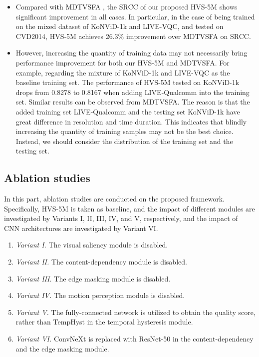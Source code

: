 \documentclass[journal]{IEEEtran}
\begin{document}
\begin{itemize}
\item Compared with MDTVSFA \cite{MDTVSFA}, the SRCC of our proposed HVS-5M shows significant improvement in all cases. In particular, in the case of being trained on the mixed dataset of KoNViD-1k and LIVE-VQC, and tested on CVD2014, HVS-5M achieves
    26.3\% improvement over MDTVSFA on SRCC. 

\item However, increasing the quantity of training data may not necessarily bring performance improvement for both our HVS-5M and MDTVSFA.
    For example, regarding the mixture of KoNViD-1k and LIVE-VQC as the baseline training set. The performance of HVS-5M tested on KoNViD-1k drops from 0.8278 to 0.8167 when adding LIVE-Qualcomm into the training set. Similar results can be observed from MDTVSFA. The reason is that the added training set LIVE-Qualcomm and the testing set KoNViD-1k have great difference in resolution and time duration. This indicates that blindly increasing the quantity of training samples may not be the best choice. Instead, we should consider the distribution of the training set and the testing set.
\end{itemize}












\subsection{Ablation studies} \label{ablation studies}






In this part, ablation studies are conducted on the proposed framework. Specifically, HVS-5M is taken as baseline, and the impact of different modules are investigated by Variants I, II, III, IV, and V, respectively, and the impact of CNN architectures are investigated by Variant VI.








\begin{enumerate}[]
\item  \textit{Variant I.} The visual saliency module is disabled.
\item  \textit{Variant II.} The content-dependency module is disabled.
\item  \textit{Variant III.} The edge masking module is disabled.
\item  \textit{Variant IV.} The motion perception module is disabled.
\item  \textit{Variant V.} The fully-connected network is utilized to obtain the quality score, rather than TempHyst in the temporal hysteresis module.
\item  \textit{Variant VI.} ConvNeXt is replaced with ResNet-50 in the content-dependency and the edge masking module.

\end{enumerate}
\end{document}
